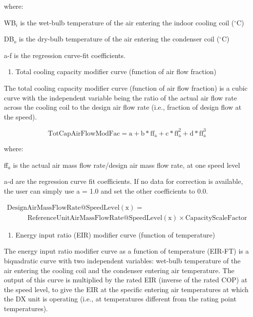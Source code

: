 where:

WB\(_{i}\) is the wet-bulb temperature of the air entering the indoor cooling coil (\(^{\circ}\)C)

DB\(_{o}\) is the dry-bulb temperature of the air entering the condenser coil (\(^{\circ}\)C)

a-f is the regression curve-fit coefficients.

\begin{enumerate}
\def\labelenumi{\arabic{enumi})}
\setcounter{enumi}{1}
\item Total cooling capacity modifier curve (function of air flow fraction)
\end{enumerate}

The total cooling capacity modifier curve (function of air flow fraction) is a cubic curve with the independent variable being the ratio of the actual air flow rate across the cooling coil to the design air flow rate (i.e., fraction of design flow at the speed).

\begin{equation}
{\mathrm{TotCapAirFlowModFac}} = {\mathrm{a}} + {\mathrm{b*f}}{{\mathrm{f}}_{\mathrm{a}}} + {\mathrm{c*ff}}_{\mathrm{a}}^2 + {\mathrm{d*ff}}_{\mathrm{a}}^3
\end{equation}

where:

ff\(_{a}\) is the actual air mass flow rate/design air mass flow rate, at one speed level

a-d are the regression curve fit coefficients.  If no data for correction is available, the user can simply use a = 1.0 and set the other coefficients to 0.0.

\begin{equation}
  \begin{array}{l}
    {\mathrm{DesignAirMassFlowRate}}@{\mathrm{SpeedLevel}}({\mathrm{x}}) = {\mathrm{}}\\\quad \quad \quad {\mathrm{ReferenceUnitAirMassFlowRate}}@{\mathrm{SpeedLevel}}({\mathrm{x}}) \times {\mathrm{CapacityScaleFactor}}
  \end{array}
\end{equation}

\begin{enumerate}
\def\labelenumi{\arabic{enumi})}
\setcounter{enumi}{2}
\tightlist
\item
  Energy input ratio (EIR) modifier curve (function of temperature)
\end{enumerate}

The energy input ratio modifier curve as a function of temperature (EIR-FT) is a biquadratic curve with two independent variables: wet-bulb temperature of the air entering the cooling coil and the condenser entering air temperature. The output of this curve is multiplied by the rated EIR (inverse of the rated COP) at the speed level, to give the EIR at the specific entering air temperatures at which the DX unit is operating (i.e., at temperatures different from the rating point temperatures).

